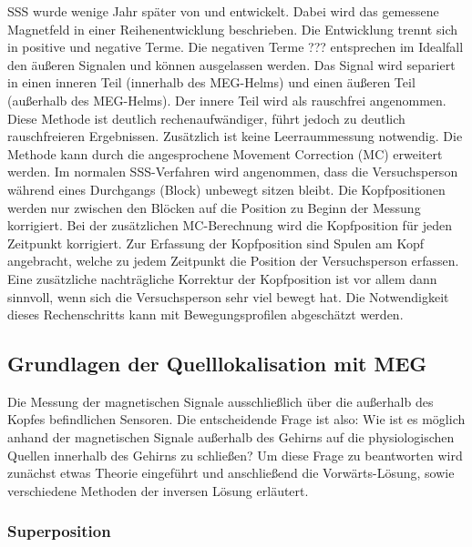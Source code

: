 \documentclass[doc,a4paper,12pt]{apa6}
\begin{document}
SSS wurde wenige Jahr später von \textcite{taulu2004suppression} und \textcite{taulu2005presentation} entwickelt. Dabei wird das gemessene Magnetfeld in einer Reihenentwicklung beschrieben. Die Entwicklung trennt sich in positive und negative Terme. Die negativen Terme ??? entsprechen im Idealfall den äußeren Signalen und können ausgelassen werden. Das Signal wird separiert in einen inneren Teil (innerhalb des MEG-Helms) und einen äußeren Teil (außerhalb des MEG-Helms). Der innere Teil wird als rauschfrei angenommen. Diese Methode ist deutlich rechenaufwändiger, führt jedoch zu deutlich rauschfreieren Ergebnissen. Zusätzlich ist keine Leerraummessung notwendig. Die Methode kann durch die angesprochene Movement Correction (MC) erweitert werden. Im normalen SSS-Verfahren wird angenommen, dass die Versuchsperson während eines Durchgangs (Block) unbewegt sitzen bleibt. Die Kopfpositionen werden nur zwischen den Blöcken auf die Position zu Beginn der Messung korrigiert. Bei der zusätzlichen MC-Berechnung wird die Kopfposition für jeden Zeitpunkt korrigiert. Zur Erfassung der Kopfposition sind Spulen am Kopf angebracht, welche zu jedem Zeitpunkt die Position der Versuchsperson erfassen. Eine zusätzliche nachträgliche Korrektur der Kopfposition ist vor allem dann sinnvoll, wenn sich die Versuchsperson sehr viel bewegt hat. Die Notwendigkeit dieses Rechenschritts kann mit Bewegungsprofilen abgeschätzt werden.


\subsection{Grundlagen der Quelllokalisation mit MEG}

Die Messung der magnetischen Signale ausschließlich über die außerhalb des Kopfes befindlichen Sensoren. Die entscheidende Frage ist also: Wie ist es möglich anhand der magnetischen Signale außerhalb des Gehirns auf die physiologischen Quellen innerhalb des Gehirns zu schließen? Um diese Frage zu beantworten wird zunächst etwas Theorie eingeführt und anschließend die Vorwärts-Lösung, sowie verschiedene Methoden der inversen Lösung erläutert.

\subsubsection{Superposition}
\end{document}
